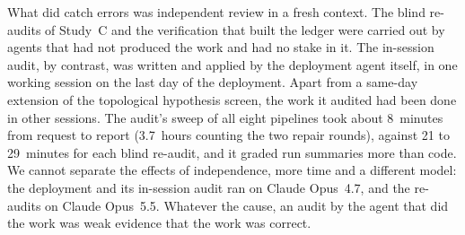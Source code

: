 What did catch errors was independent review in a fresh context. The
blind re-audits of Study~C and the verification that built the ledger
were carried out by agents that had not produced the work and had no
stake in it. The in-session audit, by contrast, was written and applied
by the deployment agent itself, in one working session on the last day of
the deployment. Apart from a same-day extension of the topological
hypothesis screen, the work it audited had been done in other sessions.
The audit's sweep of all eight pipelines took about
8~minutes from request to report (3.7~hours counting the two repair
rounds), against 21 to 29~minutes for each blind re-audit, and it graded
run summaries more than code. We cannot separate the effects of
independence, more time and a different model: the deployment and its
in-session audit ran on Claude Opus~4.7, and the re-audits on Claude
Opus~5.5. Whatever the cause, an
audit by the agent that did the work was weak evidence that the work was
correct.

